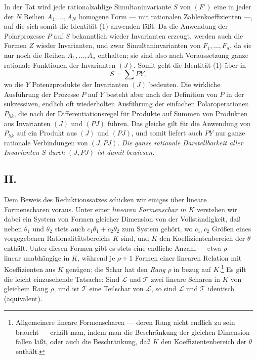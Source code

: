 \documentclass[11pt]{article}
\begin{document}
In der Tat wird jede rationalzahlige Simultaninvariante $S$ von $(F')$ eine in jeder der $N$ Reihen $A_1,\ldots,A_N$ homogene Form --- mit rationalen Zahlenkoeffizienten ---, auf die sich somit die Identität (1) anwenden läßt. Da die Anwendung der Polarprozesse $P$ auf $S$ bekanntlich wieder Invarianten erzeugt, werden auch die Formen $Z$ wieder Invarianten, und zwar Simultaninvarianten von $F_1,
\ldots,F_n$, da sie nur noch die Reihen $A_1,
\ldots,A_n$ enthalten; sie sind also nach Voraussetzung ganze rationale Funktionen der Invarianten $(J)$. Somit geht die Identität (1) über in
\[
  S=\sum PY,
\]
wo die $Y$ Potenzprodukte der Invarianten $(J)$ bedeuten. Die wirkliche Ausführung der Prozesse $P$ auf $Y$ besteht aber nach der Definition von $P$ in der sukzessiven, endlich oft wiederholten Ausführung der einfachen Polaroperationen $P_{hk}$, die nach der Differentiationsregel für Produkte auf Summen von Produkten aus Invarianten $(J)$ und $(PJ)$ führen. Das gleiche gilt für die Anwendung von $P_{hk}$ auf ein Produkt aus $(J)$ und $(PJ)$, und somit liefert auch $PY$ nur ganze rationale Verbindungen von $(J,PJ)$. \emph{Die ganze rationale Darstellbarkeit aller Invarianten $S$ durch $(J,PJ)$ ist damit bewiesen.}

\subsection*{II.}
Dem Beweis des Reduktionssatzes schicken wir einiges über lineare Formenscharen voraus. Unter einer \emph{linearen Formenschar in $K$} verstehen wir dabei ein System von Formen gleicher Dimension von der Vollständigkeit, daß neben $\theta_1$ und $\theta_2$ stets auch $c_1\theta_1+c_2\theta_2$ zum System gehört, wo $c_1,c_2$ Größen eines vorgegebenen Rationalitätsbereichs $K$ sind, und $K$ den Koeffizientenbereich der $\theta$ enthält. Unter diesen Formen gibt es stets eine endliche Anzahl --- etwa $\rho$ --- linear unabhängige in $K$, während je $\rho+1$ Formen einer linearen Relation mit Koeffizienten aus $K$ genügen; die Schar hat den \emph{Rang $\rho$} in bezug auf $K$.\footnote{Allgemeinere lineare Formenscharen --- deren Rang nicht endlich zu sein braucht --- erhält man, indem man die Beschränkung der gleichen Dimension fallen läßt, oder auch die Beschränkung, daß $K$ den Koeffizientenbereich der $\theta$ enthält.} Es gilt die leicht einzusehende Tatsache: Sind $\mathcal L$ und $\mathcal T$ zwei lineare Scharen in $K$ von gleichem Rang $\rho$, und ist $\mathcal T$ eine Teilschar von $\mathcal L$, so sind $\mathcal L$ und $\mathcal T$ identisch (äquivalent).
\end{document}
